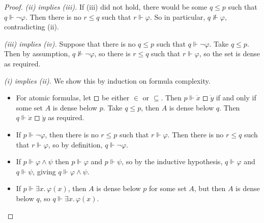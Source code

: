 \begin{proof}
    \emph{(ii) implies (iii).}
    If (iii) did not hold, there would be some \( q \leq p \) such that \( q \Vdash \neg\varphi \).
    Then there is no \( r \leq q \) such that \( r \Vdash \varphi \).
    So in particular, \( q \nVdash \varphi \), contradicting (ii).

    \emph{(iii) implies (iv).}
    Suppose that there is no \( q \leq p \) such that \( q \Vdash \neg\varphi \).
    Take \( q \leq p \).
    Then by assumption, \( q \nVdash \neg\varphi \), so there is \( r \leq q \) such that \( r \Vdash \varphi \), so the set is dense as required.

    \emph{(i) implies (ii).}
    We show this by induction on formula complexity.
    \begin{itemize}
        \item For atomic formulas, let \( \mdwhtsquare \) be either \( \in \) or \( \subseteq \).
        Then \( p \Vdash \dot x \mathrel{\mdwhtsquare} \dot y \) if and only if some set \( A \) is dense below \( p \).
        Take \( q \leq p \), then \( A \) is dense below \( q \).
        Then \( q \Vdash \dot x \mathrel{\mdwhtsquare} \dot y \) as required.
        \item If \( p \Vdash \neg\varphi \), then there is no \( r \leq p \) such that \( r \Vdash \varphi \).
        Then there is no \( r \leq q \) such that \( r \Vdash \varphi \), so by definition, \( q \Vdash \neg\varphi \).
        \item If \( p \Vdash \varphi \wedge \psi \) then \( p \Vdash \varphi \) and \( p \Vdash \psi \), so by the inductive hypothesis, \( q \Vdash \varphi \) and \( q \Vdash \psi \), giving \( q \Vdash \varphi \wedge \psi \).
        \item If \( p \Vdash \exists x.\, \varphi(x) \), then \( A \) is dense below \( p \) for some set \( A \), but then \( A \) is dense below \( q \), so \( q \Vdash \exists x.\, \varphi(x) \).
    \end{itemize}


\end{proof}
